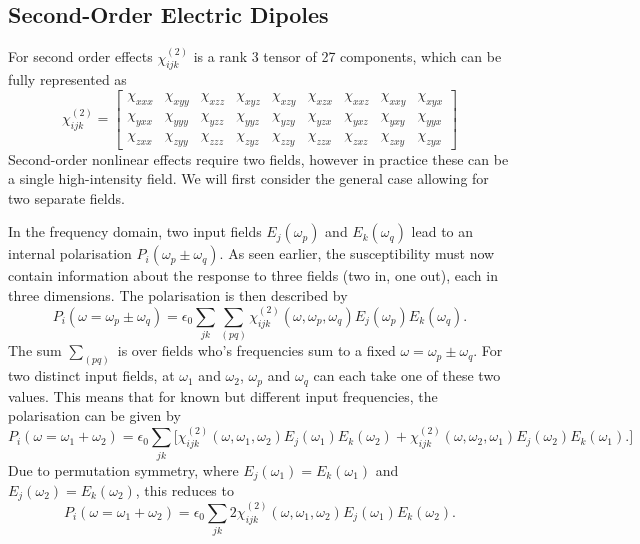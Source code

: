 \subsection{Second-Order Electric Dipoles}\label{sec:background:NonlinearOptics:shgP}
For second order effects $\chi^{(2)}_{ijk}$ is a rank 3 tensor of 27 components, which can be fully represented as
\begin{equation}\label{eq:background:NonlinearOptics:shgP:chiFull}
	\chi^{(2)}_{ijk} =
	\begin{bmatrix}
		\chi_{xxx} & \chi_{xyy} & \chi_{xzz} & \chi_{xyz} & \chi_{xzy} & \chi_{xzx} & \chi_{xxz} & \chi_{xxy} & \chi_{xyx}\\ 
		\chi_{yxx} & \chi_{yyy} & \chi_{yzz} & \chi_{yyz} & \chi_{yzy} & \chi_{yzx} & \chi_{yxz} & \chi_{yxy} & \chi_{yyx}\\ 
		\chi_{zxx} & \chi_{zyy} & \chi_{zzz} & \chi_{zyz} & \chi_{zzy} & \chi_{zzx} & \chi_{zxz} & \chi_{zxy} & \chi_{zyx}
	\end{bmatrix}
\end{equation}
Second-order nonlinear effects require two fields, however in practice these can be a single high-intensity field. We will first consider the general case allowing for two separate fields.

In the frequency domain, two input fields $E_{j}(\omega_{p} )$ and $E_{k}(\omega_{q} )$ lead to an internal polarisation $P_{i}(\omega_{p}\pm\omega_{q} )$. As seen earlier, the susceptibility must now contain information about the response to three fields (two in, one out), each in three dimensions. The polarisation is then described by 
\begin{equation}\label{eq:background:NonlinearOptics:shgP:Psfg}
	P_{i}(\omega=\omega_{p}\pm\omega_{q} ) =  \epsilon_{0} \sum_{jk} \sum_{(pq)}
				\chi^{(2)}_{ijk}(\omega, \omega_{p},\omega_{q} ) 
				E_{j}(\omega_{p} ) E_{k}(\omega_{q} ).
\end{equation}
The sum $\sum_{(pq)}$ is over fields who's frequencies sum to a fixed $\omega=\omega_{p}\pm\omega_{q}$. For two distinct input fields, at $\omega_{1}$ and $\omega_{2}$, $\omega_{p}$ and $\omega_{q}$ can each take one of these two values. This means that for known but different input frequencies, the polarisation can be given by 
\begin{equation}\label{eq:background:NonlinearOptics:shgP:Pw1w2}
	P_{i}(\omega=\omega_{1}+\omega_{2} ) =  \epsilon_{0} \sum_{jk} \big[
				\chi^{(2)}_{ijk}(\omega, \omega_{1},\omega_{2} ) 
				E_{j}(\omega_{1} ) E_{k}(\omega_{2} ) +
				\chi^{(2)}_{ijk}(\omega, \omega_{2},\omega_{1} ) 
				E_{j}(\omega_{2} ) E_{k}(\omega_{1} ).
				\big]
\end{equation}
Due to permutation symmetry, where $E_{j}(\omega_{1} )=E_{k}(\omega_{1} )$ and $E_{j}(\omega_{2} )=E_{k}(\omega_{2} )$, this reduces to~\cite[eq. 1.3.15]{Boyd2008a}
\begin{equation}\label{eq:background:NonlinearOptics:shgP:Pw1w2b}
	P_{i}(\omega=\omega_{1}+\omega_{2} ) =  \epsilon_{0} \sum_{jk}
				2 \chi^{(2)}_{ijk}(\omega, \omega_{1},\omega_{2} ) 
				E_{j}(\omega_{1} ) E_{k}(\omega_{2} ).
\end{equation}

